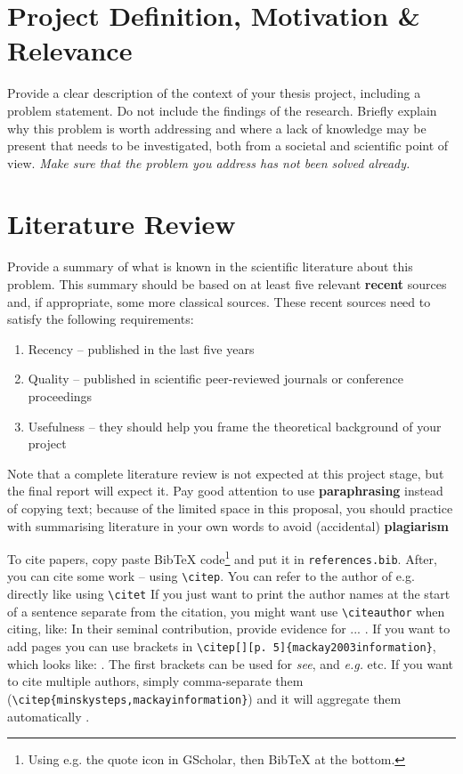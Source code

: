 \documentclass[11pt, a4paper]{article}
\begin{document}


\section{Project Definition, Motivation \& Relevance} \label{sec:introduction}
Provide a clear description of the context of your thesis project, including a problem statement. Do not include the findings of the research. Briefly explain why this problem is worth addressing and where a lack of knowledge may be present that needs to be investigated, both from a societal and scientific point of view. \textit{Make sure that the problem you address has not been solved already.}   

\section{Literature Review}
Provide a summary of what is known in the scientific literature about this problem. This summary should be based on at least five relevant \textbf{recent} sources and, if appropriate, some more classical sources. These recent sources need to satisfy the following requirements: 
\begin{enumerate}
    \item Recency – published in the last five years
    \item Quality – published in scientific peer-reviewed journals or conference proceedings
    \item Usefulness – they should help you frame the theoretical background of your project
\end{enumerate}
Note that a complete literature review is not expected at this project stage, but the final report will expect it. Pay good attention to use  \textbf{paraphrasing} instead of copying text; because of the limited space in this proposal, you should practice with summarising literature in your own words to avoid (accidental) \textbf{plagiarism}

To cite papers, copy paste BibTeX code\footnote{Using e.g. the quote icon in GScholar, then BibTeX at the bottom.} and put it in \texttt{references.bib}. After, you can cite some work \citep{mackay2003information} -- using \texttt{\textbackslash citep}. You can refer to the author of e.g. \citet{minsky1961steps} directly like using \texttt{\textbackslash citet} If you just want to print the author names at the start of a sentence separate from the citation, you might want use \texttt{\textbackslash citeauthor} when citing, like: In their seminal contribution,  \citeauthor{ananny2018seeing} provide evidence for ... \citep{ananny2018seeing}. If you want to add pages you can use brackets in \texttt{\textbackslash citep[][p. 5]\{mackay2003information\}}, which looks like: \citep[][p. 5]{mackay2003information}. The first brackets can be used for \emph{see}, and \emph{e.g.} etc. If you want to cite multiple authors, simply comma-separate them (\texttt{\textbackslash citep\{\-minsky\-steps,\-mackay\-information\}}) and it will aggregate them automatically \citep{minsky1961steps,mackay2003information}.
\end{document}
